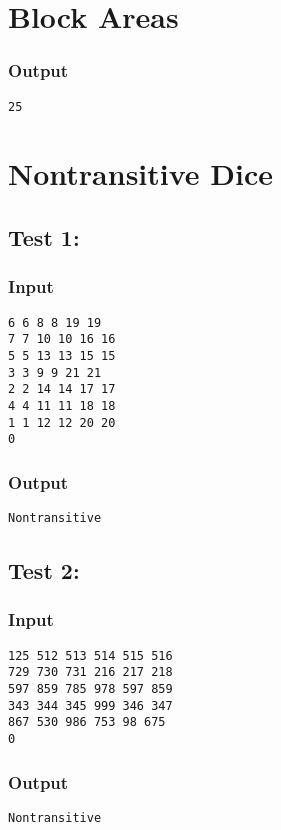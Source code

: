 \documentclass[twocolumn]{extarticle}
\begin{document}
\section{Block Areas}
\subsubsection*{Output}
\texttt{25}


\newpage
\section{Nontransitive Dice}
\subsection*{Test 1:}
\subsubsection*{Input}
\texttt{6 6 8 8 19 19\\
7 7 10 10 16 16\\
5 5 13 13 15 15\\
3 3 9 9 21 21\\
2 2 14 14 17 17\\
4 4 11 11 18 18\\
1 1 12 12 20 20\\
0}
 
\subsubsection*{Output}
\texttt{Nontransitive}
 
\subsection*{Test 2:}
\subsubsection*{Input}
\texttt{125 512 513 514 515 516\\
729 730 731 216 217 218\\
597 859 785 978 597 859\\
343 344 345 999 346 347\\
867 530 986 753 98 675\\
0}
 
\subsubsection*{Output}
\texttt{Nontransitive}
 
\end{document}
